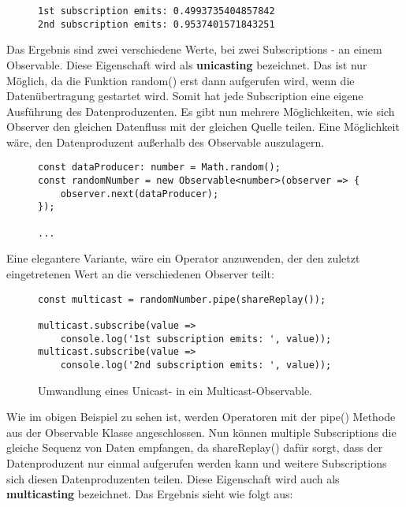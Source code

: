 \begin{figure}[H]
\begin{lstlisting}
1st subscription emits: 0.4993735404857842
2nd subscription emits: 0.9537401571843251
\end{lstlisting}
\end{figure}

\noindent
Das Ergebnis sind zwei verschiedene Werte, bei zwei Subscriptions - an einem Observable. Diese Eigenschaft wird als \textbf{unicasting} bezeichnet. Das ist nur Möglich, da die Funktion random() erst dann aufgerufen wird, wenn die Datenübertragung gestartet wird. Somit hat jede Subscription eine eigene Ausführung des Datenproduzenten. Es gibt nun mehrere Möglichkeiten, wie sich Observer den gleichen Datenfluss mit der gleichen Quelle teilen. Eine Möglichkeit wäre, den Datenproduzent außerhalb des Observable auszulagern. 

\begin{figure}[H]
\begin{lstlisting}[basicstyle=\small]
const dataProducer: number = Math.random();
const randomNumber = new Observable<number>(observer => {
    observer.next(dataProducer);
});

...
\end{lstlisting}
\end{figure}

\noindent
Eine elegantere Variante, wäre ein Operator anzuwenden, der den zuletzt eingetretenen Wert an die verschiedenen Observer teilt:

\begin{figure}[H]
\begin{lstlisting}[basicstyle=\small]
const multicast = randomNumber.pipe(shareReplay());

multicast.subscribe(value =>
    console.log('1st subscription emits: ', value));
multicast.subscribe(value =>
    console.log('2nd subscription emits: ', value));
\end{lstlisting}
\caption{Umwandlung eines Unicast- in ein Multicast-Observable.}
\label{unicast-transformation}
\end{figure}

\noindent
Wie im obigen Beispiel zu sehen ist, werden Operatoren mit der pipe() Methode aus der Observable Klasse angeschlossen. Nun können multiple Subscriptions die gleiche Sequenz von Daten empfangen, da shareReplay() dafür sorgt, dass der Datenproduzent nur einmal aufgerufen werden kann und weitere Subscriptions sich diesen Datenproduzenten teilen. Diese Eigenschaft wird auch als \textbf{multicasting} bezeichnet. Das Ergebnis sieht wie folgt aus:

